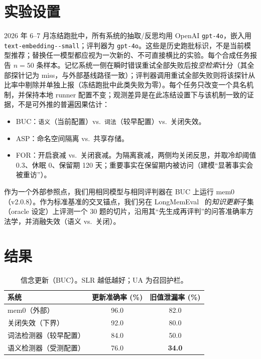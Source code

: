 \documentclass[11pt,fontset=fandol]{ctexart}
\newcommand{\bucSLRfull}{\textbf{34.0}}   %
\newcommand{\bucSLRvone}{50.0}            %
\newcommand{\bucSLRnone}{80.0}            %
\newcommand{\bucUAfull}{76.0}
\newcommand{\bucUAvone}{84.0}
\newcommand{\bucUAnone}{92.0}
\newcommand{\bucSLRmemo}{82.0}
\newcommand{\bucUAmemo}{96.0}
\newcommand{\nItems}{50}
\newcommand{\lmeN}{30}
\begin{document}
\section{实验设置}
\label{sec:setup}
2026 年 6--7 月冻结跑批中，所有系统的抽取/反思均用 OpenAI \texttt{gpt-4o}，嵌入用 \texttt{text-\allowbreak embedding--\allowbreak small}；评判器为 \texttt{gpt-4o}。这些是历史跑批标识，不是当前模型推荐；替换任一模型都应视为一次新的、不可直接横比的实验。每个合成任务报告 $n=\nItems{}$ 条样本。记忆系统一侧在瞬时错误重试全部失败后按\emph{空检索}计分（其全部探针记为 miss，与外部基线路径一致）；评判器调用重试全部失败则将该探针从比率中剔除并单独上报（冻结跑批中此类失败为零）。每个任务只改变一个具名机制，并保持本地 runner 配置不变；观测差异是在此冻结设置下与该机制一致的证据，不是可外推的普遍因果估计：
\begin{itemize}
  \item BUC：\texttt{语义}（当前配置）vs.\ \texttt{词法}（较早配置）vs.\ 关闭失效。
  \item ASP：命名空间隔离 vs.\ 共享存储。
  \item FOR：开启衰减 vs.\ 关闭衰减。为隔离衰减，两侧均关闭反思，并取冷却阈值 $0.3$、休眠 $0$、保留期 120 天；重要事实在保留期内被访问（建模“显著事实会被重访”）。
\end{itemize}
作为一个外部参照点，我们用相同模型与相同评判器在 BUC 上运行 mem0（v2.0.8）。作为标准基准的交叉锚点，我们另在 LongMemEval~\cite{longmemeval} 的\emph{知识更新}子集（oracle 设定）上评测一个 \lmeN{} 题的切片，沿用其“先生成再评判”的问答准确率方法学，并消融失效（语义 vs.\ 关闭）。

\section{结果}
\label{sec:results}
\begin{table}[t]\centering
\caption{信念更新（BUC）。SLR 越低越好；UA 为召回护栏。}
\begin{tabular}{lcc}
\toprule
系统 & 更新准确率 (\%) & 旧值泄漏率 (\%) \\
\midrule
mem0（外部）\footnotemark{}     & \bucUAmemo{} & \bucSLRmemo{} \\
关闭失效（下界）                & \bucUAnone{} & \bucSLRnone{} \\
词法检测器（较早配置）          & \bucUAvone{} & \bucSLRvone{} \\
语义检测器（受测配置）          & \bucUAfull{} & \bucSLRfull{} \\
\bottomrule
\end{tabular}
\end{table}
\end{document}
